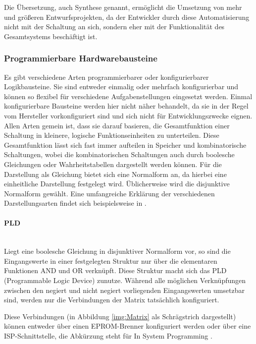 \documentclass[11pt,a4paper,titlepage]{article}
\begin{document}
Die Übersetzung, auch Synthese genannt, ermöglicht die Umsetzung von mehr und größeren Entwurfsprojekten, da der Entwickler durch diese Automatisierung nicht mit der Schaltung an sich, sondern eher mit der Funktionalität des Gesamtsystems beschäftigt ist.

\subsubsection{Programmierbare Hardwarebausteine}
\label{sec:FPGA}

Es gibt verschiedene Arten programmierbarer oder konfigurierbarer Logikbausteine. Sie sind entweder einmalig oder mehrfach konfigurierbar und können so flexibel für verschiedene Aufgabenstellungen eingesetzt werden. Einmal konfigurierbare Bausteine werden hier nicht näher behandelt, da sie in der Regel vom Hersteller vorkonfiguriert sind und sich nicht für Entwicklungszwecke eignen. \\

Allen Arten gemein ist, dass sie darauf basieren, die Gesamtfunktion einer Schaltung in kleinere, logische Funktionseinheiten zu unterteilen. Diese Gesamtfunktion lässt sich fast immer aufteilen in Speicher und kombinatorische Schaltungen, wobei die kombinatorischen Schaltungen auch durch boolesche Gleichungen oder Wahrheitstabellen dargestellt werden können. Für die Darstellung als Gleichung bietet sich eine Normalform an, da hierbei eine einheitliche Darstellung festgelegt wird. Üblicherweise wird die disjunktive Normalform gewählt. Eine umfangreiche Erklärung der verschiedenen Darstellungsarten findet sich beispielsweise in \cite[S. 119]{Hoffmann}.

\paragraph{PLD}$\;$\\

Liegt eine boolesche Gleichung in disjunktiver Normalform vor, so sind die Eingangswerte in einer festgelegten Struktur nur über die elementaren Funktionen AND und OR verknüpft. Diese Struktur macht sich das PLD (Programmable Logic Device) zunutze. Während alle möglichen Verknüpfungen zwischen den negiert und nicht negiert vorliegenden Eingangswerten umsetzbar sind, werden nur die Verbindungen der Matrix tatsächlich konfiguriert. 

Diese Verbindungen (in Abbildung \ref{img:Matrix} als Schrägstrich dargestellt) können entweder über einen EPROM-Brenner konfiguriert werden oder über eine ISP-Schnittstelle, die Abkürzung steht für In System Programming \cite{Puschmann2}.\\
\end{document}

